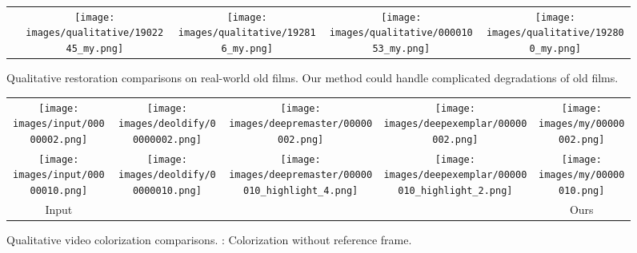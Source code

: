 \documentclass[10pt,twocolumn,letterpaper]{article}
\begin{document}
\begin{figure*}[!tb]
\begin{tabularx}{\textwidth}{ccccc}
			\raisebox{1.9\height}{\rotatebox{90}{Ours}}&
			\texttt{[image: images/qualitative/1902245\_my.png]}&
			\texttt{[image: images/qualitative/192816\_my.png]}&
			\texttt{[image: images/qualitative/00001053\_my.png]}&
			\texttt{[image: images/qualitative/192800\_my.png]}
		\end{tabularx}
		\vspace{-0.7em}
		\caption{{Qualitative restoration comparisons on real-world old films.} Our method could handle complicated degradations of old films.}
		\label{fig:comparison_realold}
		\vspace{-1.75em}
	\end{figure*}
	


	\def\swthree{0.2\linewidth}
	\renewcommand{\tabcolsep}{0.5pt}
	\begin{figure}
		\begin{center}
			\small
			\begin{tabular}{ccccc}
				\vspace{-0.5mm}\texttt{[image: images/input/00000002.png]}&
				\texttt{[image: images/deoldify/00000002.png]}&
				\texttt{[image: images/deepremaster/00000002.png]}&
				\texttt{[image: images/deepexemplar/00000002.png]}&
				\texttt{[image: images/my/00000002.png]}\\
				\texttt{[image: images/input/00000010.png]}&
				\texttt{[image: images/deoldify/00000010.png]}&
				\texttt{[image: images/deepremaster/00000010\_highlight\_4.png]}&
				\texttt{[image: images/deepexemplar/00000010\_highlight\_2.png]}&
				\texttt{[image: images/my/00000010.png]}\\
				Input & \cite{DeOldify}~  & \cite{iizuka2019deepremaster}  & \cite{zhang2019deep} &  Ours\\
			\end{tabular}
		\end{center}
		\vspace{-1.4em}
		\caption{{Qualitative video colorization comparisons.} \cite{DeOldify}: Colorization without reference frame.}
		\vspace{-1.5em}
		\label{fig:colorization_quali}
	\end{figure}
	
\end{document}
